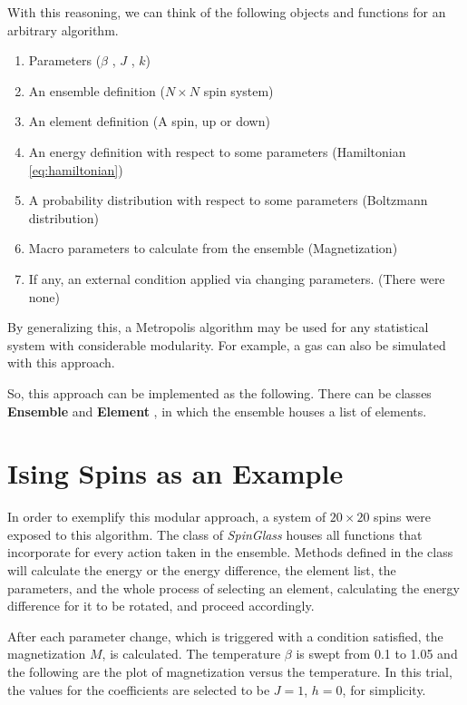 With this reasoning, we can think of the following objects and functions for an arbitrary algorithm.
 
\begin{enumerate}
\item Parameters ($ \beta $ , $ J $ , $ k $)
\item An ensemble definition ($ N\times N $ spin system)
\item An element definition  (A spin, up or down)
\item An energy definition with respect to some parameters (Hamiltonian \eqref{eq:hamiltonian})
\item A probability distribution with respect to some parameters (Boltzmann distribution)
\item Macro parameters to calculate from the ensemble (Magnetization)
\item If any, an external condition applied via changing parameters. (There were none)
\end{enumerate}

By generalizing this, a Metropolis algorithm may be used for any statistical system with considerable modularity. For example, a gas can also be simulated with this approach. 

So, this approach can be implemented as the following. There  can be classes \textbf{Ensemble} and \textbf{Element} , in which the ensemble houses a list of elements. 

\section{Ising Spins as an Example}

In order to exemplify this modular approach, a system of $ 20 \times 20 $ spins were exposed to this algorithm. The class of \emph{SpinGlass} houses all functions that incorporate for every action taken in the ensemble. Methods defined in the class will calculate the energy or the energy difference, the element list, the parameters, and the whole process of selecting an element, calculating the energy difference for it to be rotated, and proceed accordingly. 

After each parameter change, which is triggered with a condition satisfied, the magnetization $ M $, is calculated. The temperature $ \beta $ is swept from 0.1 to 1.05 and the following are the plot of magnetization versus the temperature. In this trial, the values for the coefficients are selected to be $ J=1 $, $ h=0 $, for simplicity. 

